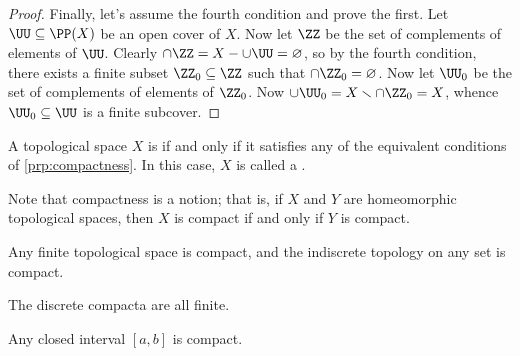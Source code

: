 \begin{proof}
	Finally, let's assume the fourth condition and prove the first.
	Let $\UU\subseteq\PP(X)$ be an open cover of $X$.
	Now let $\ZZ$ be the set of complements of elements%
	of $\UU$.
	Clearly $\cap\ZZ=X-\cup\UU=\varnothing$, so by the fourth condition, there exists a finite subset $\ZZ_0\subseteq\ZZ$ such that $\cap\ZZ_0=\varnothing$.
	Now let $\UU_0$ be the set of complements of elements%
	of $\ZZ_0$.
	Now $\cup\UU_0=X \smallsetminus \cap\ZZ_0=X$, whence $\UU_0\subseteq\UU$ is a finite subcover.
\end{proof}

\begin{dfn}
	A topological space $X$ is %
	if and only if it satisfies any of the equivalent conditions of \ref{prp:compactness}.
	In this case, $X$ is called a .
\end{dfn}

\begin{nul}
	Note that compactness is a  notion;
	that is, if $X$ and $Y$ are homeomorphic topological spaces, then $X$ is compact if and only if $Y$ is compact.%
\end{nul}

\begin{exm}
	Any finite topological space is compact, and the indiscrete topology on any set is compact.
\end{exm}

\begin{exm}
	The discrete compacta are all finite.
\end{exm}

\begin{prp}
	Any closed interval $[a,b]$ is compact.
\end{prp}

